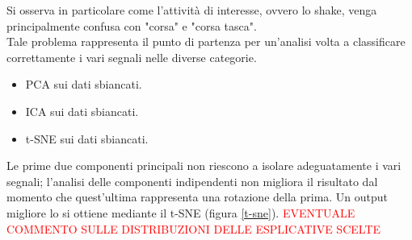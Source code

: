 \documentclass[./main.tex]{subfiles}
\begin{document}
Si osserva in particolare come l'attività di interesse, ovvero lo shake, venga principalmente confusa con "corsa" e "corsa tasca". 
\\
Tale problema rappresenta il punto di partenza per un'analisi volta a classificare correttamente i vari segnali nelle diverse categorie.

\begin{itemize}
	\item PCA sui dati sbiancati.
	\item ICA sui dati sbiancati.
	\item t-SNE sui dati sbiancati.
\end{itemize}
Le prime due componenti principali non riescono a isolare adeguatamente i vari segnali; l'analisi delle componenti indipendenti non migliora il risultato dal momento che quest'ultima rappresenta una rotazione della prima. Un output migliore lo si ottiene mediante il t-SNE (figura \ref{t-sne}). 
\textcolor{red}{EVENTUALE COMMENTO SULLE DISTRIBUZIONI DELLE ESPLICATIVE SCELTE}
\end{document}
